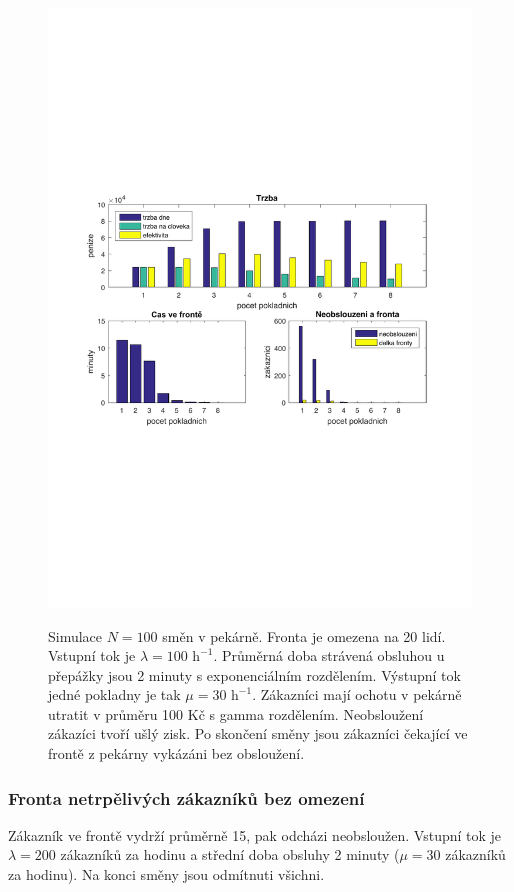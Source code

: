 \documentclass[a4paper,12pt]{article}
\begin{document}
\begin{figure}[h]
\centering
\includegraphics[width=0.99\columnwidth]{maxFronta.pdf}
\label{fig:maxFronta}
\caption{Simulace \(N=100\) směn v pekárně. Fronta je omezena na 20 lidí.
Vstupní tok je \(\lambda = 100 \mbox{~h}^{-1}\). 
Průměrná doba strávená obsluhou u přepážky jsou 2 minuty s exponenciálním rozdělením. Výstupní tok 
jedné pokladny je tak \(\mu = 30 \mbox{~h}^{-1}\). Zákazníci mají ochotu v pekárně utratit v průměru 100 Kč s gamma rozdělením. 
Neobsloužení zákazíci tvoří ušlý zisk. Po skončení směny jsou zákazníci čekající ve frontě z pekárny vykázáni bez obsloužení.}
\end{figure}

\subsubsection{Fronta netrpělivých zákazníků bez omezení}
Zákazník ve frontě vydrží průměrně 15, pak odcházi neobsloužen. Vstupní tok je \(\lambda = 200\) zákazníků za hodinu a
střední doba obsluhy 2 minuty (\(\mu = 30\) zákazníků za hodinu). Na konci směny jsou odmítnuti všichni. 
\end{document}
